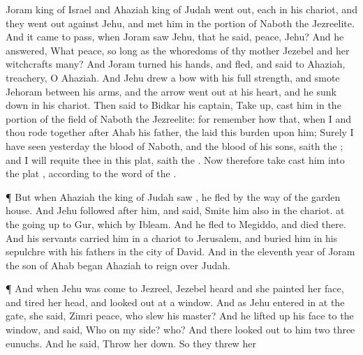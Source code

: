 {Joram
king of
Israel and
Ahaziah
king of
Judah went
out,
each in his
chariot, and they went
out
against
Jehu, and
met him in the
portion of
Naboth the
Jezreelite.
And it came to pass, when
Joram
saw
Jehu, that he
said,
{}
peace,
Jehu? And he
answered, What
peace, so long
as the
whoredoms of thy
mother
Jezebel and her
witchcrafts
{}
many?
And
Joram
turned his
hands, and
fled, and
said to
Ahaziah,
{}
treachery, O
Ahaziah.
And
Jehu drew a
bow with his
full
strength, and
smote
Jehoram between his
arms, and the
arrow went
out at his
heart, and he sunk
down in his
chariot.
Then
said
{} to
Bidkar his
captain, Take
up,
{}
cast him in the
portion of the
field of
Naboth the
Jezreelite: for
remember how that, when I and thou
rode
together
after
Ahab his
father, the
{}
laid this
burden upon him;
Surely I have
seen
yesterday the
blood of
Naboth, and the
blood of his
sons,
saith the
{}; and I will
requite thee in this
plat,
saith the
{}. Now therefore
take
{}
cast him into the
plat
{}, according to the
word of the
{}.
\par }{\PP {}¶ But when
Ahaziah the
king of
Judah
saw
{}, he
fled by the
way of the
garden
house. And
Jehu
followed
after him, and
said,
Smite him also in the
chariot.
{} at the going
up to
Gur, which
{} by
Ibleam. And he
fled to
Megiddo, and
died there.
And his
servants
carried him in a chariot to
Jerusalem, and
buried him in his
sepulchre with his
fathers in the
city of
David.
And in the
eleventh
year of
Joram the
son of
Ahab began
Ahaziah to
reign over
Judah.
\par }{\PP {}¶ And when
Jehu was
come to
Jezreel,
Jezebel
heard
{} and she
painted her
face, and
tired her
head, and looked
out at a
window.
And as
Jehu entered
in at the
gate, she
said,
{}
Zimri
peace, who
slew his
master?
And he lifted
up his
face to the
window, and
said, Who
{} on my side? who? And there looked
out to him
two
{}
three
eunuchs.
And he
said, Throw her
down. So they threw her
}
